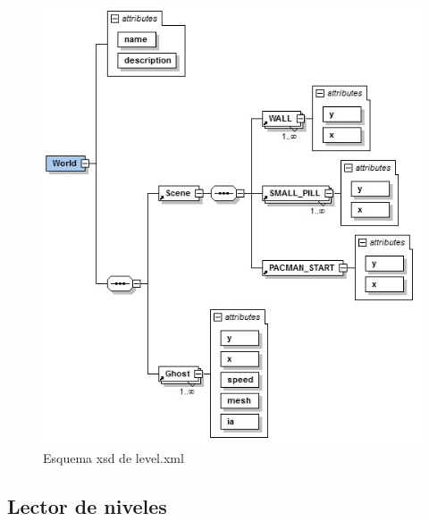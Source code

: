 \begin{figure}[!h]
	\centering	
          \includegraphics[width=14cm]{img/EsquemaXML_Nivel.jpg}
	\caption{Esquema xsd de level.xml}
\end{figure}





\subsection{Lector de niveles}

